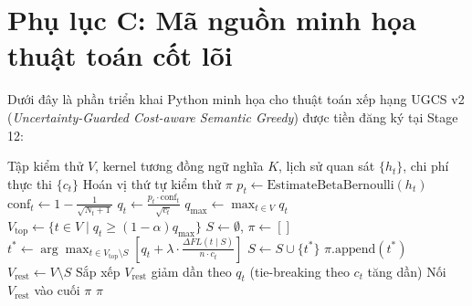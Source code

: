 \newpage
\section*{Phụ lục C: Mã nguồn minh họa thuật toán cốt lõi}
\label{app:code}

Dưới đây là phần triển khai Python minh họa cho thuật toán xếp hạng UGCS v2 (\textit{Uncertainty-Guarded Cost-aware Semantic Greedy}) được tiền đăng ký tại Stage 12:

\begin{algorithm}[H]
\caption{Mô phỏng thuật toán UGCS v2 (Uncertainty-Guarded Cost-aware Semantic Greedy)}
\label{alg:ugcs_v2_code}
\begin{algorithmic}[1]
\Require Tập kiểm thử $V$, kernel tương đồng ngữ nghĩa $K$, lịch sử quan sát $\{h_t\}$, chi phí thực thi $\{c_t\}$
\Ensure Hoán vị thứ tự kiểm thử $\pi$
\State $p_t \leftarrow \text{EstimateBetaBernoulli}(h_t)$ 
\State $\text{conf}_t \leftarrow 1 - \frac{1}{\sqrt{N_t + 1}}$ 
\State $q_t \leftarrow \frac{p_t \cdot \text{conf}_t}{\sqrt{c_t}}$ 
\State $q_{\max} \leftarrow \max_{t \in V} q_t$
\State $V_{\text{top}} \leftarrow \{t \in V \mid q_t \ge (1 - \alpha) q_{\max}\}$ 
\State $S \leftarrow \emptyset$, $\pi \leftarrow []$
    \State $t^* \leftarrow \arg\max_{t \in V_{\text{top}} \setminus S} \left[ q_t + \lambda \cdot \frac{\Delta FL(t \mid S)}{n \cdot c_t} \right]$ 
    \State $S \leftarrow S \cup \{t^*\}$
    \State $\pi.\text{append}(t^*)$
\EndWhile
\State $V_{\text{rest}} \leftarrow V \setminus S$
\State Sắp xếp $V_{\text{rest}}$ giảm dần theo $q_t$ (tie-breaking theo $c_t$ tăng dần)
\State Nối $V_{\text{rest}}$ vào cuối $\pi$
\State \Return $\pi$
\end{algorithmic}
\end{algorithm}
